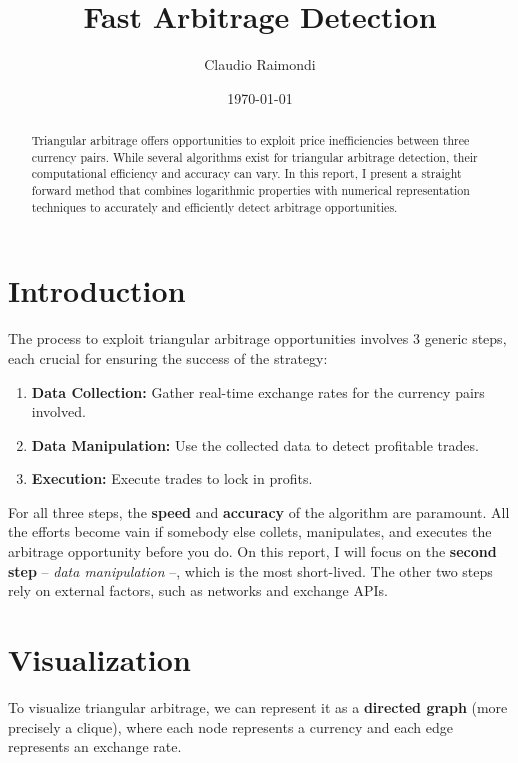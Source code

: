 \documentclass[11pt]{article}
\begin{document}
\title{Fast Arbitrage Detection}
\author{Claudio Raimondi}
\date{\today}
\maketitle

\begin{abstract}
Triangular arbitrage offers opportunities to exploit price inefficiencies between three currency pairs. While several algorithms exist for triangular arbitrage detection, their computational efficiency and accuracy can vary. In this report, I present a straight forward method that combines logarithmic properties with numerical representation techniques to accurately and efficiently detect arbitrage opportunities.
\end{abstract}

\tableofcontents

\section{Introduction}
The process to exploit triangular arbitrage opportunities involves 3 generic steps, each crucial for ensuring the success of the strategy:
\begin{enumerate}
    \item \textbf{Data Collection:} Gather real-time exchange rates for the currency pairs involved.
    \item \textbf{Data Manipulation:} Use the collected data to detect profitable trades.
    \item \textbf{Execution:} Execute trades to lock in profits.
\end{enumerate}
For all three steps, the \textbf{speed} and \textbf{accuracy} of the algorithm are paramount. All the efforts become vain if somebody else collets, manipulates, and executes the arbitrage opportunity before you do.
On this report, I will focus on the \textbf{second step} -- \textit{data manipulation} --, which is the most short-lived. The other two steps rely on external factors, such as networks and exchange APIs.

\section{Visualization}
To visualize triangular arbitrage, we can represent it as a \textbf{directed graph} (more precisely a clique), where each node represents a currency and each edge represents an exchange rate.
\end{document}

